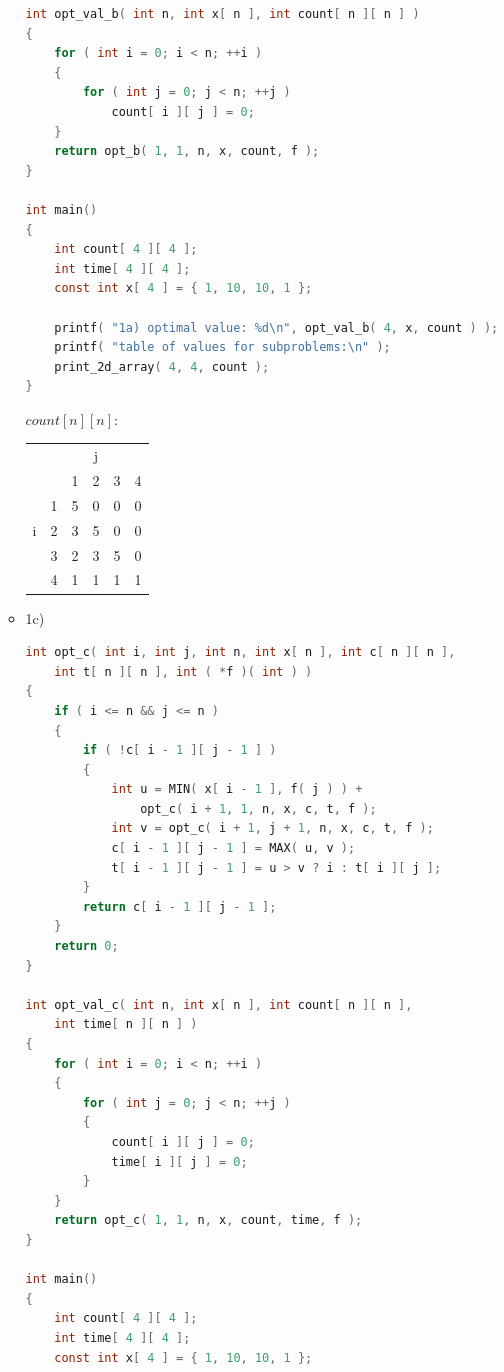 \documentclass[ 12pt ]{article}
\begin{document}
\begin{itemize}
\begin{itemize}
\begin{lstlisting}[language=C]
int opt_val_b( int n, int x[ n ], int count[ n ][ n ] )
{
	for ( int i = 0; i < n; ++i )
	{
		for ( int j = 0; j < n; ++j )
			count[ i ][ j ] = 0;
	}
	return opt_b( 1, 1, n, x, count, f );
}

int main()
{
	int count[ 4 ][ 4 ];
	int time[ 4 ][ 4 ];
	const int x[ 4 ] = { 1, 10, 10, 1 };

	printf( "1a) optimal value: %d\n", opt_val_b( 4, x, count ) );
	printf( "table of values for subproblems:\n" );
	print_2d_array( 4, 4, count );
}
		\end{lstlisting}
		\begin{center}
		$count[n][n]$:
			\begin{tabular}{ |cc|cccc| }
			\hline
			  &   &   & j &   &   \\
			  &   & 1 & 2 & 3 & 4 \\
			\hline
			  & 1 & 5 & 0 & 0 & 0 \\ 
			i & 2 & 3 & 5 & 0 & 0 \\
			  & 3 & 2 & 3 & 5 & 0 \\
			  & 4 & 1 & 1 & 1 & 1 \\
			\hline
			\end{tabular}
		\end{center}
		\newpage

		\item[] {\large 1c)}
		\begin{lstlisting}[language=C]
int opt_c( int i, int j, int n, int x[ n ], int c[ n ][ n ],
	int t[ n ][ n ], int ( *f )( int ) )
{
	if ( i <= n && j <= n )
	{
		if ( !c[ i - 1 ][ j - 1 ] )
		{
			int u = MIN( x[ i - 1 ], f( j ) ) +
				opt_c( i + 1, 1, n, x, c, t, f );
			int v = opt_c( i + 1, j + 1, n, x, c, t, f );
			c[ i - 1 ][ j - 1 ] = MAX( u, v );
			t[ i - 1 ][ j - 1 ] = u > v ? i : t[ i ][ j ];
		}
		return c[ i - 1 ][ j - 1 ];
	}
	return 0;
}

int opt_val_c( int n, int x[ n ], int count[ n ][ n ],
	int time[ n ][ n ] )
{
	for ( int i = 0; i < n; ++i )
	{
		for ( int j = 0; j < n; ++j )
		{
			count[ i ][ j ] = 0;
			time[ i ][ j ] = 0;
		}
	}
	return opt_c( 1, 1, n, x, count, time, f );
}

int main()
{
	int count[ 4 ][ 4 ];
	int time[ 4 ][ 4 ];
	const int x[ 4 ] = { 1, 10, 10, 1 };


\end{lstlisting}
\end{itemize}
\end{itemize}
\end{document}
